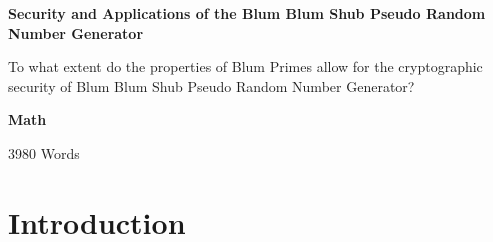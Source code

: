 \documentclass{article}
\begin{document}


\begin{titlepage}
   \begin{center}
       \vspace*{1cm}

       \textbf{Security and Applications of the Blum Blum Shub Pseudo Random Number Generator}

       \vspace{0.5cm}
        To what extent do the properties of Blum Primes allow for the cryptographic security of Blum Blum Shub Pseudo Random Number Generator?
            
       \vspace{1.5cm}

       \textbf{Math}

       \vfill
            
       \vspace{0.8cm}
     
    3980 Words       
       
            
   \end{center}
\end{titlepage}

\tableofcontents
\newpage

\section{Introduction}
\end{document}
